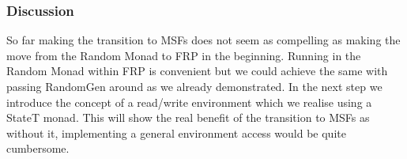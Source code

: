 \subsubsection{Discussion}
So far making the transition to MSFs does not seem as compelling as making the move from the Random Monad to FRP in the beginning. Running in the Random Monad within FRP is convenient but we could achieve the same with passing RandomGen around as we already demonstrated. In the next step we introduce the concept of a read/write environment which we realise using a StateT monad. This will show the real benefit of the transition to MSFs as without it, implementing a general environment access would be quite cumbersome.